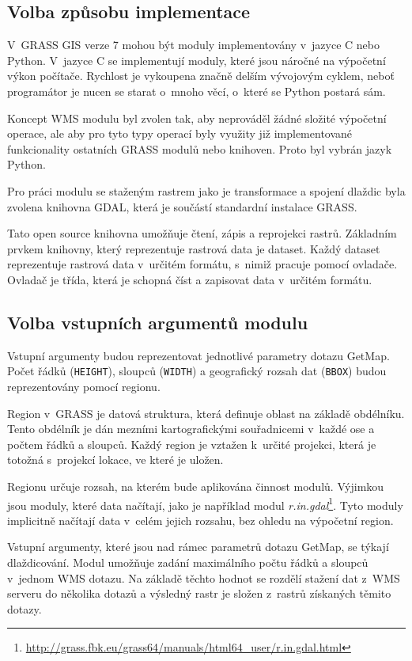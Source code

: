 \documentclass[a4paper,12pt]{article}
\begin{document}
\subsection{Volba způsobu implementace}

V~GRASS GIS verze 7 mohou být moduly implementovány v~jazyce C nebo
Python. V~jazyce C se implementují moduly, které jsou náročné na
výpočetní výkon počítače.  Rychlost je vykoupena značně delším
vývojovým cyklem, neboť programátor je nucen se starat o~mnoho věcí,
o~které se Python postará sám.

Koncept WMS modulu byl zvolen tak, aby neprováděl žádné složité
výpočetní operace, ale aby pro tyto typy operací byly využity již
implementované funkcionality ostatních GRASS modulů nebo
knihoven. Proto byl vybrán jazyk Python.

Pro práci modulu se staženým rastrem jako je transformace a spojení
dlaždic byla zvolena knihovna GDAL, která je součástí standardní
instalace GRASS.

Tato open source knihovna umožňuje čtení, zápis a reprojekci rastrů.
Základním prvkem knihovny, který reprezentuje rastrová data je
dataset. Každý dataset reprezentuje rastrová data v~určitém formátu,
s~nimiž pracuje pomocí ovladače. Ovladač je třída, která je schopná číst
a zapisovat data v~určitém formátu.

\subsection{Volba vstupních argumentů modulu}


Vstupní argumenty budou reprezentovat jednotlivé parametry dotazu
GetMap. Počet řádků ({\tt HEIGHT}), sloupců ({\tt WIDTH}) a geografický rozsah dat
({\tt BBOX}) budou reprezentovány pomocí regionu.

Region v~GRASS je datová struktura, která definuje oblast na základě
obdélníku. Tento obdélník je dán mezními kartografickými souřadnicemi
v~každé ose a počtem řádků a sloupců. Každý region je
vztažen k~určité projekci, která je totožná s~projekcí lokace, ve
které je uložen.

Regionu určuje rozsah, na kterém bude aplikována činnost
modulů. Výjimkou jsou
moduly, které data načítají, jako je například modul \emph{r.in.gdal}\footnote{\url{http://grass.fbk.eu/grass64/manuals/html64_user/r.in.gdal.html}}. Tyto
moduly implicitně načítají data v~celém jejich rozsahu, bez ohledu na
výpočetní region.

Vstupní argumenty, které jsou nad rámec parametrů dotazu GetMap, se
týkají dlaždicování. Modul umožňuje zadání maximálního počtu řádků a
sloupců v~jednom WMS dotazu. Na základě těchto hodnot se rozdělí
stažení dat z~WMS serveru do několika dotazů a výsledný rastr je
složen z~rastrů získaných těmito dotazy.
   
\end{document}
